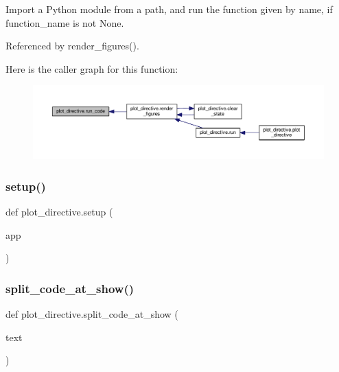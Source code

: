 \begin{DoxyVerb}Import a Python module from a path, and run the function given by
name, if function_name is not None.
\end{DoxyVerb}
 

Referenced by render\+\_\+figures().

Here is the caller graph for this function\+:
\nopagebreak
\begin{figure}[H]
\begin{center}
\leavevmode
\includegraphics[width=350pt]{namespaceplot__directive_a469169f4fbfd6b8948d1a02bcd9eb85c_icgraph}
\end{center}
\end{figure}
\mbox{\label{namespaceplot__directive_a039f93d2038ba504a023cbbf76ad8478}} 
\subsubsection{\texorpdfstring{setup()}{setup()}}
{\footnotesize\ttfamily def plot\+\_\+directive.\+setup (\begin{DoxyParamCaption}\item[{}]{app }\end{DoxyParamCaption})}

\mbox{\label{namespaceplot__directive_afda02d52fee93a95c4b928b0d4b250aa}} 
\subsubsection{\texorpdfstring{split\+\_\+code\+\_\+at\+\_\+show()}{split\_code\_at\_show()}}
{\footnotesize\ttfamily def plot\+\_\+directive.\+split\+\_\+code\+\_\+at\+\_\+show (\begin{DoxyParamCaption}\item[{}]{text }\end{DoxyParamCaption})}

